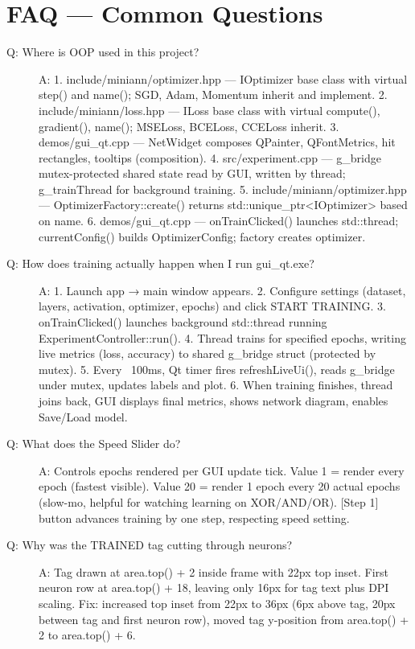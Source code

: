 \documentclass[12pt]{article}
\begin{document}
\section{FAQ — Common Questions}
\begin{description}
\item[Q: Where is OOP used in this project?]
A: 1. include/miniann/optimizer.hpp — IOptimizer base class with virtual step() and name(); SGD, Adam, Momentum inherit and implement. 2. include/miniann/loss.hpp — ILoss base class with virtual compute(), gradient(), name(); MSELoss, BCELoss, CCELoss inherit. 3. demos/gui\_qt.cpp — NetWidget composes QPainter, QFontMetrics, hit rectangles, tooltips (composition). 4. src/experiment.cpp — g\_bridge mutex-protected shared state read by GUI, written by thread; g\_trainThread for background training. 5. include/miniann/optimizer.hpp — OptimizerFactory::create() returns std::unique\_ptr<IOptimizer> based on name. 6. demos/gui\_qt.cpp — onTrainClicked() launches std::thread; currentConfig() builds OptimizerConfig; factory creates optimizer.

\item[Q: How does training actually happen when I run gui\_qt.exe?]
A: 1. Launch app → main window appears. 2. Configure settings (dataset, layers, activation, optimizer, epochs) and click START TRAINING. 3. onTrainClicked() launches background std::thread running ExperimentController::run(). 4. Thread trains for specified epochs, writing live metrics (loss, accuracy) to shared g\_bridge struct (protected by mutex). 5. Every ~100ms, Qt timer fires refreshLiveUi(), reads g\_bridge under mutex, updates labels and plot. 6. When training finishes, thread joins back, GUI displays final metrics, shows network diagram, enables Save/Load model.

\item[Q: What does the Speed Slider do?]
A: Controls epochs rendered per GUI update tick. Value 1 = render every epoch (fastest visible). Value 20 = render 1 epoch every 20 actual epochs (slow-mo, helpful for watching learning on XOR/AND/OR). [Step 1] button advances training by one step, respecting speed setting.

\item[Q: Why was the TRAINED tag cutting through neurons?]
A: Tag drawn at area.top() + 2 inside frame with 22px top inset. First neuron row at area.top() + 18, leaving only 16px for tag text plus DPI scaling. Fix: increased top inset from 22px to 36px (6px above tag, 20px between tag and first neuron row), moved tag y-position from area.top() + 2 to area.top() + 6.


\end{description}
\end{document}
